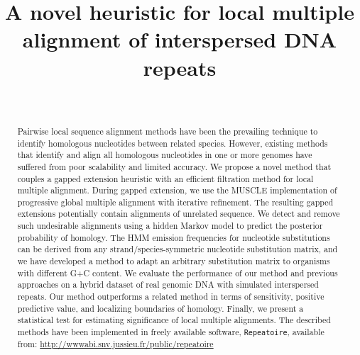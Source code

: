 \documentclass[12pt,journal,draftcls,letterpaper,onecolumn]{IEEEtran}
\begin{document}
%
\title{A novel heuristic for local multiple alignment of interspersed DNA repeats}
%
%
\author{\ \ }



\maketitle
\linenumbers
\begin{abstract}
Pairwise local sequence alignment methods have been the prevailing technique to identify homologous nucleotides between related species. However, existing methods that identify and align all homologous nucleotides in one or more genomes have suffered from poor scalability and limited accuracy. We propose a novel method that couples a gapped extension heuristic with an efficient filtration method for local multiple alignment.  During gapped extension, we use the MUSCLE implementation of progressive global multiple alignment with iterative refinement.  The resulting gapped extensions potentially contain alignments of unrelated sequence.  We detect and remove such undesirable alignments using a hidden Markov model to predict the posterior probability of homology. The HMM
emission frequencies for nucleotide substitutions can be derived from any strand/species-symmetric nucleotide substitution matrix, and we have developed a method to adapt an arbitrary substitution matrix
to organisms with different G+C content. We evaluate the performance of our method and previous approaches on a hybrid dataset of real genomic DNA with simulated interspersed repeats.  Our method
outperforms a related method in terms of sensitivity, positive predictive value, and localizing boundaries of homology. Finally, we present a statistical test for estimating significance of local multiple alignments. The described methods have been implemented in freely available software, \texttt{Repeatoire}, available from: \url{http://wwwabi.snv.jussieu.fr/public/repeatoire}
\end{abstract}
\end{document}
